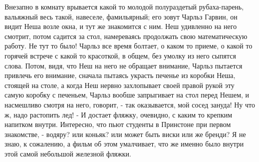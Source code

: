Внезапно в комнату
врывается какой то молодой полураздетый рубаха-парень, вальяжный весь такой,
навеселе, фамильярный; его зовут Чарльз Гарвин, он видит Неша возле окна, и тут
же знакомится с ним.  Неш удивленно на него смотрит, потом садится за стол,
намереваясь продолжать свою математическую работу. Не тут то было!  Чарльз все
время болтает, о каком то приеме, о какой то горячей встрече с какой то
красоткой, в общем, без умолку из него сыпятся слова.  Потом, видя, что Неш на
него не обращает внимание, Чарльз пытается привлечь его внимание, сначала
пытаясь украсть печенье из коробки Неша, стоящей на столе, а когда Неш нервно
захлопывает своей правой рукой эту самую коробку с печеньем, Чарльз вообше
запрыгивает на стол перед Нешем, и насмешливо смотря на него, говорит, - так
оказывается, мой сосед зануда! Ну что ж, надо растопить лед! - И достает
фляжку, очевидно, с каким то крепким напитком внутри.  Интересно, что пьют
студенты в Принстоне при первом знакомстве, - водяру? или коньяк? или может
быть виски или же бренди?  Я не знаю, к сожалению, а фильм об этом умалчивает,
что же именно было внутри этой самой небольшой железной фляжки. 
